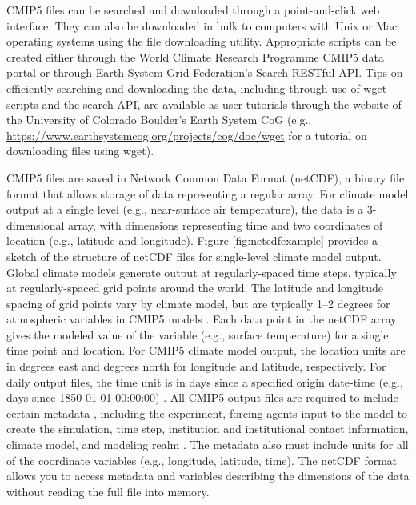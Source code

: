 CMIP5 files can be searched and downloaded through a point-and-click web
interface. They can also be downloaded in bulk to computers with Unix or
Mac operating systems using the  file downloading utility.
Appropriate  scripts can be created either through the World
Climate Research Programme CMIP5 data portal or through Earth System
Grid Federation's Search RESTful API. Tips on efficiently searching and
downloading the data, including through use of wget scripts and the
search API, are available as user tutorials through the website of the
University of Colorado Boulder's Earth System CoG (e.g.,
\url{https://www.earthsystemcog.org/projects/cog/doc/wget} for a
tutorial on downloading files using wget).

CMIP5 files are saved in Network Common Data Format (netCDF), a binary
file format that allows storage of data representing a regular array.
For climate model output at a single level (e.g., near-surface air
temperature), the data is a 3-dimensional array, with dimensions
representing time and two coordinates of location (e.g., latitude and
longitude). Figure \ref{fig:netcdfexample} provides a sketch of the
structure of netCDF files for single-level climate model output. Global
climate models generate output at regularly-spaced time steps, typically
at regularly-spaced grid points around the world. The latitude and
longitude spacing of grid points vary by climate model, but are
typically 1--2 degrees for atmospheric variables in CMIP5 models
\citep{IPCCch9}. Each data point in the netCDF array gives the modeled
value of the variable (e.g., surface temperature) for a single time
point and location. For CMIP5 climate model output, the location units
are in degrees east and degrees north for longitude and latitude,
respectively. For daily output files, the time unit is in days since a
specified origin date-time (e.g., days since 1850-01-01 00:00:00)
\citep{taylor2010cmip5}. All CMIP5 output files are required to include
certain metadata \citep{taylor2010cmip5}, including the experiment,
forcing agents input to the model to create the simulation, time step,
institution and institutional contact information, climate model, and
modeling realm \citep{taylor2010cmip5}. The metadata also must include
units for all of the coordinate variables (e.g., longitude, latitude,
time). The netCDF format allows you to access metadata and variables
describing the dimensions of the data without reading the full file into
memory.

